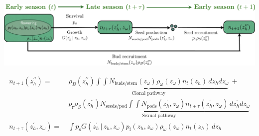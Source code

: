 \documentclass[10pt]{article}
\begin{document}
\begin{framed}

\begin{center}
\includegraphics[width=5.5in]{life-cycle-diagram.pdf}

\begin{align*}
n_{t+1}(z_{h}^{\prime\prime}) = \ & \underbrace{\rho_{B}(z_{h}^{\prime\prime})\int\int N_{\mathrm{buds/stem}}(z_{\omega})\rho_{\omega}(z_{\omega})n_{t}(z_{h})\, dz_{h}dz_{\omega}}_\text{Clonal pathway} \ + \\
  & \underbrace{p_{\mathrm{r}}\rho_{S}(z_{h}^{\prime\prime})N_{\mathrm{seeds/pod}}\int\int N_{\mathrm{pods}}\left(z_{h}^{\prime},z_{\omega}\right)n_{t+\tau}(z_{h}^{\prime},z_{\omega}) \,dz_{h}^{\prime}dz_{\omega}}_\text{Sexual pathway} \\
n_{t+\tau}(z_{h}^{\prime},z_{\omega}) = \ & \int p_{\mathrm{s}} G(z_{h}^{\prime}\, | \, z_{h},z_{\omega})p_{\mathrm{f}}(z_{h},z_{\omega})\rho_{\omega}(z_{\omega})n_{t}(z_{h})\, dz_{h}
\end{align*}

\end{center}

\vspace{0.35in}


\end{framed}
\end{document}
